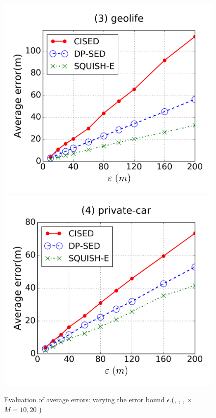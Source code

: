 \begin{figure}[tb]
\includegraphics[scale = 0.25]{figures/Exp-error-epsilon-geolife.png}
\includegraphics[scale = 0.25]{figures/Exp-error-epsilon-private.png}
\vspace{-3ex}
\caption{\small Evaluation of average errors: varying the error bound $\epsilon$.(\cist, \cista, \dpa, \squishe  $\times$ $M = 10, {20}$ )}
\label{fig:ae}
\vspace{-1ex}
\end{figure}


